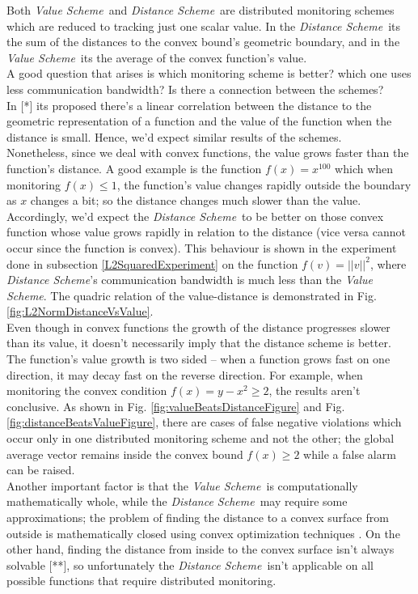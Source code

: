 \documentclass[10pt, conference]{IEEEtran}
\newcommand{\valueScheme}{\textit{Value Scheme}}
\newcommand{\distanceScheme}{\textit{Distance Scheme}}
\begin{document}
Both \valueScheme \ and \distanceScheme \ are distributed monitoring schemes which are reduced to tracking just one scalar value. In the \distanceScheme \ its the sum of the distances to the convex bound's geometric boundary, and in the \valueScheme \ its the average of the convex function's value. \\
A good question that arises is which monitoring scheme is better? which one uses less communication bandwidth? Is there a connection between the schemes? \\
In [*] its proposed there's a linear correlation between the distance to the geometric representation of a function and the value of the function when the distance is small. Hence, we'd expect similar results of the schemes. \\
Nonetheless, since we deal with convex functions, the value grows faster than the function's distance. A good example is the function ${f(x) = x^{100}}$ which  when monitoring ${f(x) \leq 1}$, the function's value changes rapidly outside the boundary as $x$ changes a bit; so the distance changes much slower than the value. Accordingly, we'd expect the \distanceScheme \ to be better on those convex function whose value grows rapidly in relation to the distance (vice versa cannot occur since the function is convex). This behaviour is shown in the experiment done in subsection \ref{L2SquaredExperiment} on the function ${f(v) = ||v||^2}$, where \distanceScheme 's communication bandwidth is much less than the \valueScheme . The quadric relation of the value-distance is demonstrated in Fig. \ref{fig:L2NormDistanceVsValue}. \\
Even though in convex functions the growth of the distance progresses slower than its value, it doesn't necessarily imply that the distance scheme is better. The function's value growth is two sided -- when a function grows fast on one direction, it may decay fast on the reverse direction. For example, when monitoring the convex condition ${f(x) = y-x^2 \geq 2}$, the results aren't conclusive. As shown in Fig. \ref{fig:valueBeatsDistanceFigure} and Fig. \ref{fig:distanceBeatsValueFigure}, there are cases of false negative violations which occur only in one distributed monitoring scheme and not the other; the global average vector remains inside the convex bound ${f(x) \geq 2}$ while a false alarm can be raised. \\
Another important factor is that the \valueScheme \ is computationally mathematically whole, while the \distanceScheme \ may require some approximations; the problem of finding the distance to a convex surface from outside is mathematically closed using convex optimization techniques \cite{boyd2004convex}. On the other hand, finding the distance from inside to the convex surface isn't always solvable [**], so unfortunately the \distanceScheme \ isn't applicable on all possible functions that require distributed monitoring.
\end{document}
